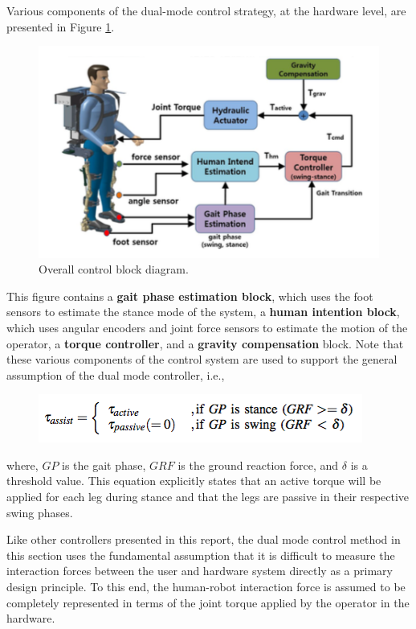 \begin{refsection}
Various components of the dual-mode control strategy, at the hardware level, are presented in Figure \ref{fig:suitDia}.  
  \begin{figure}[thpb]
\centering
\includegraphics[width=3.in]{exos/figs/hydLowerExrem/suitDia}
  \caption{Overall control block diagram.}
 \label{fig:suitDia}   
 \end{figure}
This figure contains a {\bf gait phase estimation block}, which uses the foot sensors to estimate the stance mode of the system, a {\bf human intention block}, which uses angular encoders and joint force sensors to estimate the motion of the operator, a {\bf torque controller}, and a {\bf gravity compensation} block.  Note that these various components of the control system are used to support the general assumption of the dual mode controller, i.e., 
 \begin{figure}[thpb]
\centering
\includegraphics[width=3.in]{exos/figs/hydLowerExrem/torAssist}
 \end{figure}
 \noindent
where, $GP$ is the gait phase, $GRF$ is the ground reaction force, and $\delta$ is a threshold value.  This equation explicitly states that an active torque will be applied for each leg during stance and that the legs are passive in their respective swing phases.

Like other controllers presented in this report, the dual mode control method in this section uses the fundamental assumption that it is difficult to measure the interaction forces between the user and hardware system directly as a primary design principle.  To this end, the human-robot interaction force is assumed to be completely represented in terms of the joint torque applied by the operator in the hardware. 


\end{refsection}
